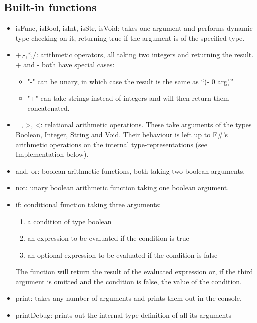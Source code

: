 \documentclass[11pt]{article}
\begin{document}
    \subsection{Built-in functions}
        \begin{itemize}
            \item isFunc, isBool, isInt, isStr, isVoid: takes one argument and performs dynamic type checking on it, returning true if the argument is of the specified type.
            \item +,-,*,/: arithmetic operators, all taking two integers and returning the result. + and - both have special cases:
            \begin{itemize}
                \item "-" can be unary, in which case the result is the same as “(- 0 arg)”
                \item "+" can take strings instead of integers and will then return them concatenated.
            \end{itemize}
            \item =, \textgreater, \textless: relational arithmetic operations. These take arguments of the types Boolean, Integer, String and Void. Their behaviour is left up to F\#’s arithmetic operations on the internal type-representations (see Implementation below).
            \item and, or: boolean arithmetic functions, both taking two boolean arguments.
            \item not: unary boolean arithmetic function taking one boolean argument.
            \item if: conditional function taking three arguments:
                \begin{enumerate}
                    \item a condition of type boolean
                    \item an expression to be evaluated if the condition is true
                    \item an optional expression to be evaluated if the condition is false
                \end{enumerate}
                  The function will return the result of the evaluated expression or, if the third argument is omitted and the condition is false, the value of the condition.
            \item print: takes any number of arguments and prints them out in the console.
            \item printDebug: prints out the internal type definition of all its arguments

\end{itemize}
\end{document}
